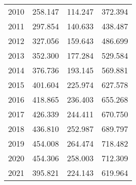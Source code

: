 \begin{tabular}{llll}
\multicolumn{1}{l}{\hspace{1em}2010} &
  \multicolumn{1}{|r}{258.147} &
  \multicolumn{1}{r}{114.247} &
  \multicolumn{1}{r}{372.394} \\
\multicolumn{1}{l}{\hspace{1em}2011} &
  \multicolumn{1}{|r}{297.854} &
  \multicolumn{1}{r}{140.633} &
  \multicolumn{1}{r}{438.487} \\
\multicolumn{1}{l}{\hspace{1em}2012} &
  \multicolumn{1}{|r}{327.056} &
  \multicolumn{1}{r}{159.643} &
  \multicolumn{1}{r}{486.699} \\
\multicolumn{1}{l}{\hspace{1em}2013} &
  \multicolumn{1}{|r}{352.300} &
  \multicolumn{1}{r}{177.284} &
  \multicolumn{1}{r}{529.584} \\
\multicolumn{1}{l}{\hspace{1em}2014} &
  \multicolumn{1}{|r}{376.736} &
  \multicolumn{1}{r}{193.145} &
  \multicolumn{1}{r}{569.881} \\
\multicolumn{1}{l}{\hspace{1em}2015} &
  \multicolumn{1}{|r}{401.604} &
  \multicolumn{1}{r}{225.974} &
  \multicolumn{1}{r}{627.578} \\
\multicolumn{1}{l}{\hspace{1em}2016} &
  \multicolumn{1}{|r}{418.865} &
  \multicolumn{1}{r}{236.403} &
  \multicolumn{1}{r}{655.268} \\
\multicolumn{1}{l}{\hspace{1em}2017} &
  \multicolumn{1}{|r}{426.339} &
  \multicolumn{1}{r}{244.411} &
  \multicolumn{1}{r}{670.750} \\
\multicolumn{1}{l}{\hspace{1em}2018} &
  \multicolumn{1}{|r}{436.810} &
  \multicolumn{1}{r}{252.987} &
  \multicolumn{1}{r}{689.797} \\
\multicolumn{1}{l}{\hspace{1em}2019} &
  \multicolumn{1}{|r}{454.008} &
  \multicolumn{1}{r}{264.474} &
  \multicolumn{1}{r}{718.482} \\
\multicolumn{1}{l}{\hspace{1em}2020} &
  \multicolumn{1}{|r}{454.306} &
  \multicolumn{1}{r}{258.003} &
  \multicolumn{1}{r}{712.309} \\
\multicolumn{1}{l}{\hspace{1em}2021} &
  \multicolumn{1}{|r}{395.821} &
  \multicolumn{1}{r}{224.143} &
  \multicolumn{1}{r}{619.964} \\
\cline{1-4}
\end{tabular}
